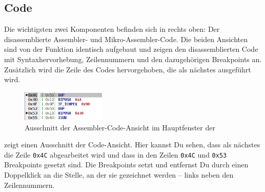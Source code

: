\subsection{Code}
Die wichtigsten zwei Komponenten befinden sich in  rechts oben: Der disassemblierte Assembler- und Mikro-Assembler-Code. Die beiden Ansichten sind von der Funktion identisch aufgebaut und zeigen den disassemblierten Code mit Syntaxhervorhebung, Zeilennummern und den dazugehörigen Breakpoints an. Zusätzlich wird die Zeile des Codes hervorgehoben, die als nächstes ausgeführt wird.

\begin{figure}[h]
	\centering
	\includegraphics[width=4cm]{images/main-frame-code-part}
	\caption{Ausschnitt der Assembler-Code-Ansicht im Hauptfenster der \mdg}
\end{figure}

 zeigt einen Ausschnitt der Code-Ansicht. Hier kannst Du sehen, dass als nächstes die Zeile \texttt{0x4C} abgearbeitet wird und dass in den Zeilen \texttt{0x4C} und \texttt{0x53} Breakpoints gesetzt sind. Die Breakpoints setzt und entfernst Du durch einen Doppelklick an die Stelle, an der sie gezeichnet werden -- links neben den Zeilennummern.



